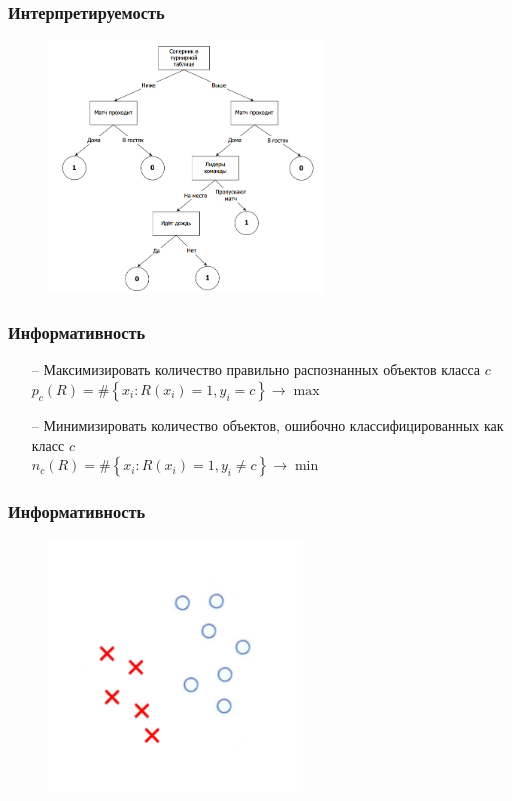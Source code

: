 \documentclass[12pt]{beamer}
\begin{document}
\begin{frame}\frametitle{Интерпретируемость}
\begin{figure}[htbp]
  \includegraphics[height=190pt, keepaspectratio = true]{images/dtree}   
\end{figure}
\end{frame}

\begin{frame}\frametitle{Информативность}
	\begin{itemize}
		\item[--] Максимизировать количество правильно распознанных объектов класса $c$\\
		${ p_c(R) = \# \left\{ x_i: R(x_i) = 1 , y_i = c \right\} \rightarrow \max }$\\

		\item[--] Минимизировать количество объектов, ошибочно классифицированных как класс $c$\\
		${ n_c(R) = \# \left\{ x_i: R(x_i) = 1 , y_i \neq c \right\} \rightarrow \min }$\\
		
	\end{itemize}
\end{frame}

\begin{frame}\frametitle{Информативность}
\begin{figure}[htbp]
  \includegraphics[height=190pt, keepaspectratio = true]{images/dtree_1}   
\end{figure}
\end{frame}
\end{document}
